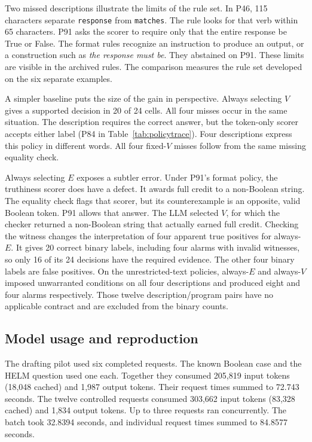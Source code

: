 \documentclass[sigconf]{acmart}
\begin{document}
Two missed descriptions illustrate the limits of the rule set. In P46, 115 characters separate \texttt{response} from \texttt{matches}. The rule looks for that verb within 65 characters. P91 asks the scorer to require only that the entire response be True or False. The format rules recognize an instruction to produce an output, or a construction such as \emph{the response must be}. They abstained on P91. These limits are visible in the archived rules. The comparison measures the rule set developed on the six separate examples.

A simpler baseline puts the size of the gain in perspective. Always selecting $V$ gives a supported decision in 20 of 24 cells. All four misses occur in the same situation. The description requires the correct answer, but the token-only scorer accepts either label (P84 in Table~\ref{tab:policytrace}). Four descriptions express this policy in different words. All four fixed-$V$ misses follow from the same missing equality check.

Always selecting $E$ exposes a subtler error. Under P91's format policy, the truthiness scorer does have a defect. It awards full credit to a non-Boolean string. The equality check flags that scorer, but its counterexample is an opposite, valid Boolean token. P91 allows that answer. The LLM selected $V$, for which the checker returned a non-Boolean string that actually earned full credit. Checking the witness changes the interpretation of four apparent true positives for always-$E$. It gives 20 correct binary labels, including four alarms with invalid witnesses, so only 16 of its 24 decisions have the required evidence. The other four binary labels are false positives. On the unrestricted-text policies, always-$E$ and always-$V$ imposed unwarranted conditions on all four descriptions and produced eight and four alarms respectively. Those twelve description/program pairs have no applicable contract and are excluded from the binary counts.

\subsection{Model usage and reproduction}

The drafting pilot used six completed requests. The known Boolean case and the HELM question used one each. Together they consumed 205,819 input tokens (18,048 cached) and 1,987 output tokens. Their request times summed to 72.743 seconds. The twelve controlled requests consumed 303,662 input tokens (83,328 cached) and 1,834 output tokens. Up to three requests ran concurrently. The batch took 32.8394 seconds, and individual request times summed to 84.8577 seconds.
\end{document}
